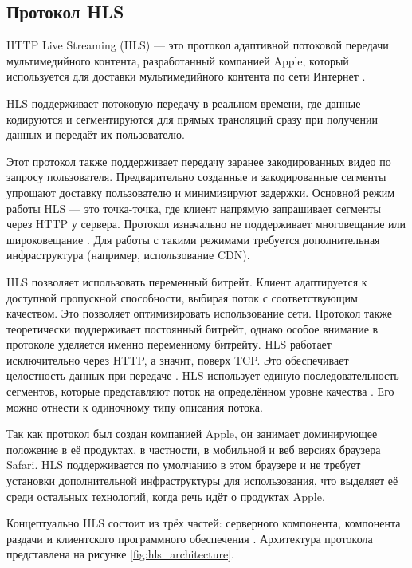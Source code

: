 \subsection{Протокол HLS}

	HTTP Live Streaming (HLS) — это протокол адаптивной потоковой передачи мультимедийного контента, разработанный компанией Apple, который используется для доставки мультимедийного контента по сети Интернет \cite{rfcHls}.
	
	HLS поддерживает потоковую передачу в реальном времени, где данные кодируются и сегментируются для прямых трансляций сразу при получении данных и передаёт их пользователю.
	
	Этот протокол также поддерживает передачу заранее закодированных видео по запросу пользователя. Предварительно созданные и закодированные сегменты упрощают доставку пользователю и минимизируют задержки. Основной режим работы HLS — это точка-точка, где клиент напрямую запрашивает сегменты через HTTP у сервера. Протокол изначально не поддерживает многовещание или широковещание \cite{rfcHls}. Для работы с такими режимами требуется дополнительная инфраструктура (например, использование CDN).
	
	HLS позволяет использовать переменный битрейт. Клиент адаптируется к доступной пропускной способности, выбирая поток с соответствующим качеством. Это позволяет оптимизировать использование сети. Протокол также теоретически поддерживает постоянный битрейт, однако особое внимание в протоколе уделяется именно переменному битрейту. HLS работает исключительно через HTTP, а значит, поверх TCP. Это обеспечивает целостность данных при передаче \cite{rfcHls}. HLS использует единую последовательность сегментов, которые представляют поток на определённом уровне качества \cite{fecheyrHlsReview}. Его можно отнести к одиночному типу описания потока.
	
	Так как протокол был создан компанией Apple, он занимает доминирующее положение в её продуктах, в частности, в мобильной и веб версиях браузера Safari. HLS поддерживается по умолчанию в этом браузере и не требует установки дополнительной инфраструктуры для использования, что выделяет её среди остальных технологий, когда речь идёт о продуктах Apple.
	
	Концептуально HLS состоит из трёх частей: серверного компонента, компонента раздачи и клиентского программного обеспечения \cite{fecheyrHlsReview}. Архитектура протокола представлена на рисунке \ref{fig:hls_architecture}.

